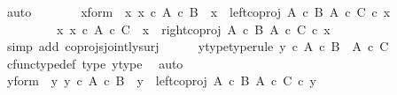 \begin{isabellebody}
\ auto\isanewline
\ \ \ \ \isamarkupfalse%
\ \isamarkupfalse%
\ x{\isacharunderscore}{\kern0pt}form{\isacharcolon}{\kern0pt}\ {\isachardoublequoteopen}{\isacharparenleft}{\kern0pt}{\isasymexists}\ x{\isacharprime}{\kern0pt}{\isachardot}{\kern0pt}\ x{\isacharprime}{\kern0pt}\ {\isasymin}\isactrlsub c\ A\ {\isasymtimes}\isactrlsub c\ B\ {\isasymand}\ x\ {\isacharequal}{\kern0pt}\ {\isacharparenleft}{\kern0pt}left{\isacharunderscore}{\kern0pt}coproj\ {\isacharparenleft}{\kern0pt}A\ {\isasymtimes}\isactrlsub c\ B{\isacharparenright}{\kern0pt}\ {\isacharparenleft}{\kern0pt}A\ {\isasymtimes}\isactrlsub c\ C{\isacharparenright}{\kern0pt}{\isacharparenright}{\kern0pt}\ {\isasymcirc}\isactrlsub c\ x{\isacharprime}{\kern0pt}{\isacharparenright}{\kern0pt}\isanewline
\ \ \ \ \ \ {\isasymor}\ \ {\isacharparenleft}{\kern0pt}{\isasymexists}\ x{\isacharprime}{\kern0pt}{\isachardot}{\kern0pt}\ x{\isacharprime}{\kern0pt}\ {\isasymin}\isactrlsub c\ A\ {\isasymtimes}\isactrlsub c\ C\ {\isasymand}\ x\ {\isacharequal}{\kern0pt}\ {\isacharparenleft}{\kern0pt}right{\isacharunderscore}{\kern0pt}coproj\ {\isacharparenleft}{\kern0pt}A\ {\isasymtimes}\isactrlsub c\ B{\isacharparenright}{\kern0pt}\ {\isacharparenleft}{\kern0pt}A\ {\isasymtimes}\isactrlsub c\ C{\isacharparenright}{\kern0pt}{\isacharparenright}{\kern0pt}\ {\isasymcirc}\isactrlsub c\ x{\isacharprime}{\kern0pt}{\isacharparenright}{\kern0pt}{\isachardoublequoteclose}\isanewline
\ \ \ \ \ \ \isamarkupfalse%
\ {\isacharparenleft}{\kern0pt}simp\ add{\isacharcolon}{\kern0pt}\ coprojs{\isacharunderscore}{\kern0pt}jointly{\isacharunderscore}{\kern0pt}surj{\isacharparenright}{\kern0pt}\isanewline
\ \ \ \ \isamarkupfalse%
\ y{\isacharunderscore}{\kern0pt}type{\isacharbrackleft}{\kern0pt}type{\isacharunderscore}{\kern0pt}rule{\isacharbrackright}{\kern0pt}{\isacharcolon}{\kern0pt}\ {\isachardoublequoteopen}y\ {\isasymin}\isactrlsub c\ {\isacharparenleft}{\kern0pt}A\ {\isasymtimes}\isactrlsub c\ B{\isacharparenright}{\kern0pt}\ {\isasymCoprod}\ {\isacharparenleft}{\kern0pt}A\ {\isasymtimes}\isactrlsub c\ C{\isacharparenright}{\kern0pt}{\isachardoublequoteclose}\isanewline
\ \ \ \ \ \ \isamarkupfalse%
\ cfunc{\isacharunderscore}{\kern0pt}type{\isacharunderscore}{\kern0pt}def\ {\isasymphi}{\isacharunderscore}{\kern0pt}type\ y{\isacharunderscore}{\kern0pt}type\ \isamarkupfalse%
\ auto\isanewline
\ \ \ \ \isamarkupfalse%
\ \isamarkupfalse%
\ y{\isacharunderscore}{\kern0pt}form{\isacharcolon}{\kern0pt}\ {\isachardoublequoteopen}{\isacharparenleft}{\kern0pt}{\isasymexists}\ y{\isacharprime}{\kern0pt}{\isachardot}{\kern0pt}\ y{\isacharprime}{\kern0pt}\ {\isasymin}\isactrlsub c\ A\ {\isasymtimes}\isactrlsub c\ B\ {\isasymand}\ y\ {\isacharequal}{\kern0pt}\ {\isacharparenleft}{\kern0pt}left{\isacharunderscore}{\kern0pt}coproj\ {\isacharparenleft}{\kern0pt}A\ {\isasymtimes}\isactrlsub c\ B{\isacharparenright}{\kern0pt}\ {\isacharparenleft}{\kern0pt}A\ {\isasymtimes}\isactrlsub c\ C{\isacharparenright}{\kern0pt}{\isacharparenright}{\kern0pt}\ {\isasymcirc}\isactrlsub c\ y{\isacharprime}{\kern0pt}{\isacharparenright}{\kern0pt}\isanewline

\end{isabellebody}
